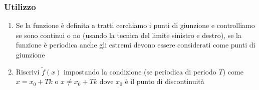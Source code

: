\documentclass[10pt, a4paper]{article}
\begin{document}
        \subsubsection{Utilizzo}
        \begin{enumerate}
            \item Se la funzione è definita a tratti cerchiamo i punti di giunzione e controlliamo se sono continui o no (usando la tecnica del limite sinistro e destro), se la funzione è periodica anche gli estremi devono essere considerati come punti di giunzione            \item Riscrivi $\tilde{f}(x)$ impostando la condizione (se periodica di periodo $T$) come $x=x_0+Tk$ o $x\neq x_0+Tk$ dove $x_0$ è il punto di discontinuità
        \end{enumerate}
\end{document}
